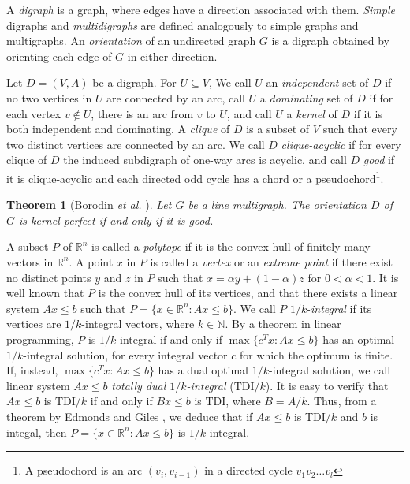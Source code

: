 \documentclass[11pt]{article}
\newtheorem{theorem}{Theorem}%
\numberwithin{theorem}{section}
\begin{document}
A \textit{digraph} is a graph, where edges have a direction associated with them. \textit{Simple} digraphs and \textit{multidigraphs} are defined analogously to simple graphs and multigraphs. An \textit{orientation} of an undirected graph $G$ is a digraph obtained by orienting each edge of $G$ in either direction. 

Let $D=(V,A)$ be a digraph. 
For $U\subseteq V$, We call $U$ an \textit{independent} set of $D$ if no two vertices in $U$ are connected by an arc, call $U$ a \textit{dominating} set of $D$ if for each vertex $v\not\in U$, there is an arc from $v$ to $U$, and call $U$ a \textit{kernel} of $D$ if it is both independent and dominating. 
A \textit{clique} of $D$ is a subset of $V$ such that every two distinct vertices are connected by an arc. We call $D$ \textit{clique-acyclic} if for every clique of $D$ the induced subdigraph of one-way arcs is acyclic, and call $D$ \textit{good} if it is clique-acyclic and each directed odd cycle has a chord or a pseudochord\footnote{A pseudochord is an arc $(v_i,v_{i-1})$ in a directed cycle $v_1 v_2\ldots v_l$}. 

\begin{theorem}[Borodin \textit{et al.} \cite{BoroKost98}]
\label{thm:BoroKost98}
Let $G$ be a line multigraph. The orientation $D$ of $G$ is kernel perfect if and only if it is good.
\end{theorem}

A subset $P$ of $\mathbb{R}^n$ is called a \textit{polytope} if it is the convex hull of finitely many vectors in $\mathbb{R}^n$. A point $x$ in $P$ is called a \textit{vertex} or an \textit{extreme point} if there exist no distinct points $y$ and $z$ in $P$ such that $x=\alpha y+ (1-\alpha)z$ for $0<\alpha<1$. It is well known that $P$ is the convex hull of its vertices, and that there exists a linear system $Ax\leq b$ such that $P=\{x\in\mathbb{R}^n:Ax\leq b\}$. We call $P$ $1/k$-\textit{integral} if its vertices are $1/k$-integral vectors, where $k\in\mathbb{N}$. By a theorem in linear programming, $P$ is $1/k$-integral if and only if $\max\{c^T x:Ax\leq b\}$ has an optimal $1/k$-integral solution, for every integral vector $c$ for which the optimum is finite. If, instead, $\max\{c^T x:Ax\leq b\}$ has a dual optimal $1/k$-integral solution, we call linear system $Ax\leq b$ \textit{totally dual $1/k$-integral} (TDI$/k$).
It is easy to verify that $Ax\leq b$ is TDI$/k$ if and only if $Bx\leq b$ is TDI, where $B=A/k$. Thus, from a theorem by Edmonds and Giles \cite{EdmoGile77}, we deduce that if $Ax\leq b$ is TDI$/k$ and $b$ is integal, then $P=\{x\in\mathbb{R}^n:Ax\leq b\}$ is $1/k$-integral.
\end{document}
